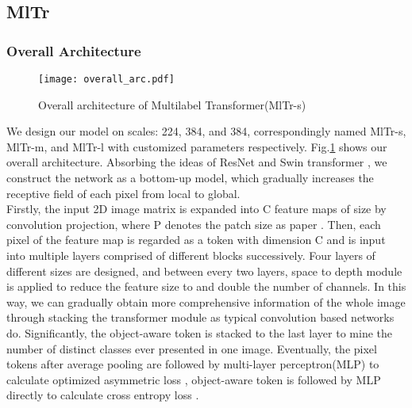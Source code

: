 \documentclass{article} \usepackage[numbers,sort&compress]{natbib}
\begin{document}
\subsection{MlTr}
\subsubsection{Overall Architecture}
\begin{figure}[h]
\begin{center}
\texttt{[image: overall\_arc.pdf]}
\caption{Overall architecture of Multilabel Transformer(MlTr-s)}
\label{figure2}
\end{center}
\end{figure}
We design our model on scales: 224, 384, and 384, correspondingly named MlTr-s, MlTr-m, and MlTr-l with customized parameters respectively. Fig.\ref{figure2} shows our overall architecture. Absorbing the ideas of ResNet \cite{he2016deep} and Swin transformer \cite{liu2021swin}, we construct the network as a bottom-up model, which gradually increases the receptive field of each pixel from local to global. \\
Firstly, the input 2D image matrix is expanded into C feature maps of size  by convolution projection, where P denotes the patch size as paper \cite{vaswani2017attention}. Then, each pixel of the feature map is regarded as a token with dimension C and is input into multiple layers comprised of different blocks successively. Four layers of different sizes are designed, and between every two layers, space to depth module \cite{heo2021rethinking} is applied to reduce the feature size to  and double the number of channels. In this way, we can gradually obtain more comprehensive information of the whole image through stacking the transformer module as typical convolution based networks do. Significantly, 
the object-aware token is stacked to the last layer to mine the number of distinct classes ever presented in one image. Eventually, the pixel tokens after average pooling \cite{boureau2010theoretical} are followed by multi-layer perceptron(MLP) to calculate optimized asymmetric loss \cite{ben2020asymmetric}, object-aware token is followed by MLP directly to calculate cross entropy loss \cite{jang2016categorical,de2005tutorial}.
\end{document}

